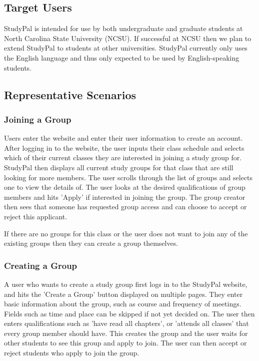 \documentclass[conference]{IEEEtran}
\begin{document}
\subsection{Target Users}
StudyPal is intended for use by both undergraduate and graduate students at North Carolina State University (NCSU).
If successful at NCSU then we plan to extend StudyPal to students at other universities.
StudyPal currently only uses the English language and thus only expected to be used by English-speaking students.


\subsection{Representative Scenarios}

\subsubsection{Joining a Group}
Users enter the website and enter their user information to create an account.
After logging in to the website, the user inputs their class schedule and selects which of their current classes they are interested in joining a study group for.
StudyPal then displays all current study groups for that class that are still looking for more members.
The user scrolls through the list of groups and selects one to view the details of.
The user looks at the desired qualifications of group members and hits 'Apply' if interested in joining the group.
The group creator then sees that someone has requested group access and can choose to accept or reject this applicant.

If there are no groups for this class or the user does not want to join any of the existing groups then they can create a group themselves.

\subsubsection{Creating a Group}
A user who wants to create a study group first logs in to the StudyPal website, and hits the 'Create a Group' button displayed on multiple pages.
They enter basic information about the group, such as course and frequency of meetings.
Fields such as time and place can be skipped if not yet decided on.
The user then enters qualifications such as 'have read all chapters', or 'attends all classes' that every group member should have.
This creates the group and the user waits for other students to see this group and apply to join.
The user can then accept or reject students who apply to join the group.
\end{document}
